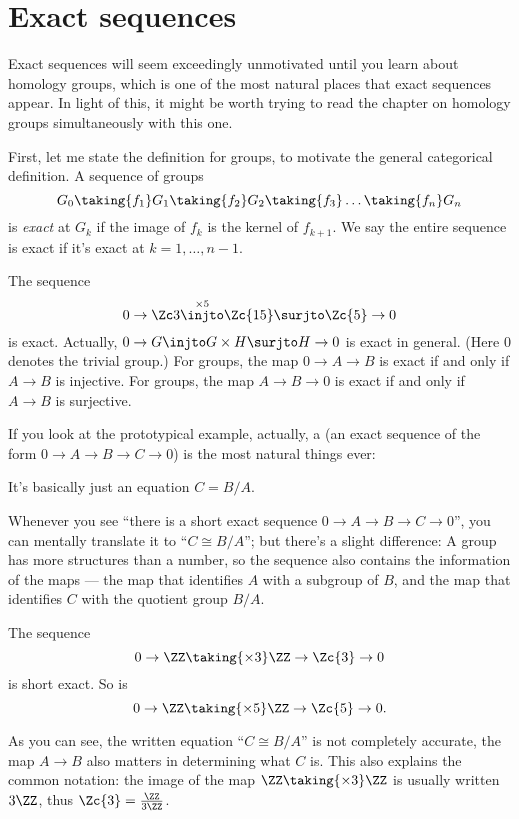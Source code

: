 \section{Exact sequences}
\label{sec:exact_sequences}
Exact sequences will seem exceedingly unmotivated until you learn about homology groups,
which is one of the most natural places that exact sequences appear.
In light of this, it might be worth trying to read the chapter on homology groups
simultaneously with this one.

First, let me state the definition for groups, to motivate the general categorical definition.
A sequence of groups
\[ G_0 \taking{f_1} G_1 \taking{f_2} G_2 \taking{f_3} \dots \taking{f_n} G_n \]
is \emph{exact} at $G_k$ if the image of $f_k$ is the kernel of $f_{k+1}$.
We say the entire sequence is exact if it's exact at $k=1,\dots,n-1$.
\begin{example}
	\listhack
	\begin{enumerate}[(a)]
		\ii The sequence
		\[ 0 \to \Zc 3
			\overset{\times 5}{\injto} \Zc{15}
			\surjto \Zc{5}
			\to 0 \]
		is exact.
		Actually, $0 \to G \injto G \times H \surjto H \to 0$ is exact in general.
		(Here $0$ denotes the trivial group.)
		\ii For groups, the map $0 \to A \to B$ is exact if and only if $A \to B$ is injective.
		\ii For groups, the map $A \to B \to 0$ is exact if and only if $A \to B$ is surjective.
	\end{enumerate}
\end{example}

If you look at the prototypical example, actually, a  (an exact sequence
of the form $0 \to A \to B \to C \to 0$) is the most natural things ever:
\begin{moral}
	It's basically just an equation $C = B/A$.
\end{moral}
Whenever you see ``there is a short exact sequence $0 \to A \to B \to C \to 0$'', you
can mentally translate it to ``$C \cong B/A$''; but there's a slight difference:
A group has more structures than a number, so the sequence also contains the information of the
maps --- the map that identifies $A$ with a subgroup of $B$, and the map that identifies $C$
with the quotient group $B/A$.
\begin{example}
	\listhack
	\begin{enumerate}[(a)]
		\ii The sequence
			\[ 0 \to \ZZ \taking{\times 3} \ZZ \to \Zc{3} \to 0 \]
		is short exact.
		\ii So is
			\[ 0 \to \ZZ \taking{\times 5} \ZZ \to \Zc{5} \to 0. \]
	\end{enumerate}
	As you can see, the written equation ``$C \cong B/A$'' is not completely accurate, the map $A
	\to B$ also matters in determining what $C$ is. This also explains the common notation: the
	image of the map $\ZZ \taking{\times 3} \ZZ$ is usually written $3 \ZZ$, thus $\Zc{3} =
	\frac{\ZZ}{3 \ZZ}$.
\end{example}

